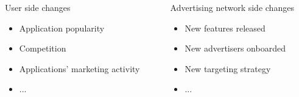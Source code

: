 \documentclass[intlimits, 9pt, unicode]{beamer}
\begin{document}
\begin{frame}
             \vspace{1.2cm}

       {\begin{columns}
        \begin{column}{5cm}
        User side changes
         \begin{itemize}
    		\item Application popularity
		\item Competition
		\item Applications' marketing activity
		\item ...
   	 \end{itemize}
        \end{column}
        
        \begin{column}{5cm}
        Advertising network side changes
         \begin{itemize}
    		\item New features released
		\item New advertisers onboarded
		\item New targeting strategy
		\item ...
   	 \end{itemize}
	 \end{column}
    \end{columns}}

 \end{frame}
\end{document}
